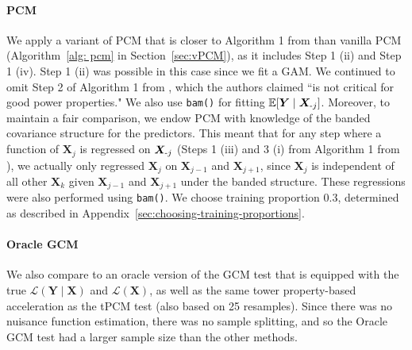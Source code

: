 \documentclass[12pt]{article}
\theoremstyle{definition}
\theoremstyle{remark}
\newcommand{\prx}{\bm X}								%
\newcommand{\pry}{{\bm Y}}								%
\newcommand{\law}{\mathcal L}							%
\newcommand{\minus}{\textnormal{-}} 						    %
\begin{document}
	\paragraph{PCM} We apply a variant of PCM that is closer to Algorithm 1 from \citet{Lundborg2022a} than vanilla PCM (Algorithm~\ref{alg: pcm} in Section~\ref{sec:vPCM}), as it includes Step 1 (ii) and Step 1 (iv). Step 1 (ii) was possible in this case since we fit a GAM. We continued to omit Step 2 of Algorithm 1 from \citet{Lundborg2022a}, which the authors claimed ``is not critical for good power properties." We also use \verb|bam()| for fitting $\mathbb{E}[\pry \mid \prx_{\minus j}]$. Moreover, to maintain a fair comparison, we endow PCM with knowledge of the banded covariance structure for the predictors. This meant that for any step where a function of $\prx_j$ is regressed on $\prx_{\minus j}$ (Steps 1 (iii) and 3 (i) from Algorithm 1 from \citet{Lundborg2022a}), we actually only regressed $\prx_j$ on $\prx_{j-1}$ and $\prx_{j+1}$, since $\prx_j$ is independent of all other $\mathbf{X}_k$ given $\prx_{j-1}$ and $\prx_{j+1}$ under the banded structure. These regressions were also performed using \verb|bam()|. We choose training proportion 0.3, determined as described in Appendix~\ref{sec:choosing-training-proportions}.

	\paragraph{Oracle GCM} We also compare to an oracle version of the GCM test that is equipped with the true $\law(\pry \mid \prx)$ and $\law(\prx)$, as well as the same tower property-based acceleration as the tPCM test (also based on 25 resamples). Since there was no nuisance function estimation, there was no sample splitting, and so the Oracle GCM test had a larger sample size than the other methods. 
\end{document}

